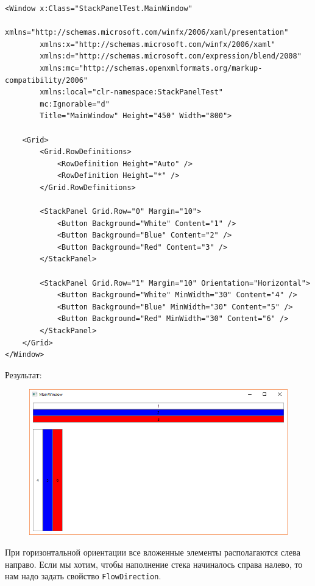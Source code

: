 \begin{verbatim}
<Window x:Class="StackPanelTest.MainWindow"
        xmlns="http://schemas.microsoft.com/winfx/2006/xaml/presentation"
        xmlns:x="http://schemas.microsoft.com/winfx/2006/xaml"
        xmlns:d="http://schemas.microsoft.com/expression/blend/2008"
        xmlns:mc="http://schemas.openxmlformats.org/markup-compatibility/2006"
        xmlns:local="clr-namespace:StackPanelTest"
        mc:Ignorable="d"
        Title="MainWindow" Height="450" Width="800">

    <Grid>
        <Grid.RowDefinitions>
            <RowDefinition Height="Auto" />
            <RowDefinition Height="*" />
        </Grid.RowDefinitions>
        
        <StackPanel Grid.Row="0" Margin="10">
            <Button Background="White" Content="1" />
            <Button Background="Blue" Content="2" />
            <Button Background="Red" Content="3" />
        </StackPanel>

        <StackPanel Grid.Row="1" Margin="10" Orientation="Horizontal">
            <Button Background="White" MinWidth="30" Content="4" />
            <Button Background="Blue" MinWidth="30" Content="5" />
            <Button Background="Red" MinWidth="30" Content="6" />
        </StackPanel>
    </Grid>
</Window>
\end{verbatim}

\newpage
Результат:

\begin{figure}[H]
\centering
\includegraphics[width=1\textwidth]{manager_stackpanel.png}
\end{figure}

При горизонтальной ориентации все вложенные элементы располагаются слева направо. Если мы хотим, чтобы наполнение стека начиналось справа налево, то нам надо задать свойство \texttt{FlowDirection}.

